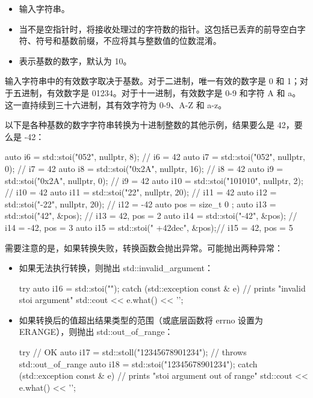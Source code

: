 \begin{itemize}
\item
输入字符串。

\item
当不是空指针时，将接收处理过的字符数的指针。这包括已丢弃的前导空白字符、符号和基数前缀，不应将其与整数值的位数混淆。

\item
表示基数的数字，默认为 10。
\end{itemize}

输入字符串中的有效数字取决于基数。对于二进制，唯一有效的数字是 0 和 1；对于五进制，有效数字是 01234。对于十一进制，有效数字是 0-9 和字符 A 和 a。这一直持续到三十六进制，其有效字符为 0-9、A-Z 和 a-z。

以下是各种基数的数字字符串转换为十进制整数的其他示例，结果要么是 42，要么是 -42：

\begin{cpp}
auto i6 = std::stoi("052", nullptr, 8);      // i6 = 42
auto i7 = std::stoi("052", nullptr, 0);      // i7 = 42
auto i8 = std::stoi("0x2A", nullptr, 16);    // i8 = 42
auto i9 = std::stoi("0x2A", nullptr, 0);     // i9 = 42
auto i10 = std::stoi("101010", nullptr, 2); // i10 = 42
auto i11 = std::stoi("22", nullptr, 20);    // i11 = 42
auto i12 = std::stoi("-22", nullptr, 20);  // i12 = -42
auto pos = size_t{ 0 };
auto i13 = std::stoi("42", &pos);      // i13 = 42,  pos = 2
auto i14 = std::stoi("-42", &pos);     // i14 = -42, pos = 3
auto i15 = std::stoi("  +42dec", &pos);// i15 = 42,  pos = 5
\end{cpp}

需要注意的是，如果转换失败，转换函数会抛出异常。可能抛出两种异常：

\begin{itemize}
\item
如果无法执行转换，则抛出 std::invalid\_argument：

\begin{cpp}
try
{
    auto i16 = std::stoi("");
}
catch (std::exception const & e)
{
    // prints "invalid stoi argument"
    std::cout << e.what() << '\n';
}
\end{cpp}

\item
如果转换后的值超出结果类型的范围（或底层函数将 errno 设置为 ERANGE），则抛出 std::out\_of\_range：

\begin{cpp}
try
{
    // OK
    auto i17 = std::stoll("12345678901234");
    // throws std::out_of_range
    auto i18 = std::stoi("12345678901234");
}
catch (std::exception const & e)
{
    // prints "stoi argument out of range"
    std::cout << e.what() << '\n';
}
\end{cpp}
\end{itemize}

